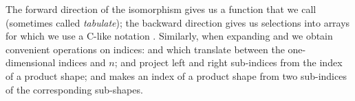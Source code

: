 \begin{AgdaSuppressSpace}
\end{AgdaSuppressSpace}
The forward direction of the  isomorphism gives us
a function that we call  (sometimes called
\emph{tabulate}); the backward direction gives us selections into
arrays for which we use a C-like notation \AF{\_[\_]}.
Similarly, when expanding  and 
we obtain convenient operations on indices:  and 
which translate between the one-dimensional indices and  $n$;
 and  project left and right sub-indices from
the index of a product shape; and  makes an index
of a product shape from two sub-indices of the corresponding
sub-shapes.
